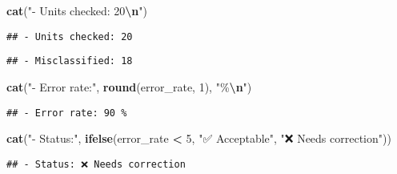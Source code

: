 \documentclass[
]{article}
\newenvironment{Shaded}{\begin{snugshade}}{\end{snugshade}}
\newcommand{\DecValTok}[1]{\textcolor[rgb]{0.00,0.00,0.81}{#1}}
\newcommand{\FunctionTok}[1]{\textcolor[rgb]{0.13,0.29,0.53}{\textbf{#1}}}
\newcommand{\NormalTok}[1]{#1}
\newcommand{\SpecialCharTok}[1]{\textcolor[rgb]{0.81,0.36,0.00}{\textbf{#1}}}
\newcommand{\StringTok}[1]{\textcolor[rgb]{0.31,0.60,0.02}{#1}}
\begin{document}
\begin{Shaded}
\begin{Highlighting}[]
\FunctionTok{cat}\NormalTok{(}\StringTok{"{-} Units checked: 20}\SpecialCharTok{\textbackslash{}n}\StringTok{"}\NormalTok{)}
\end{Highlighting}
\end{Shaded}

\begin{verbatim}
## - Units checked: 20
\end{verbatim}

\begin{Shaded}
\end{Shaded}

\begin{verbatim}
## - Misclassified: 18
\end{verbatim}

\begin{Shaded}
\begin{Highlighting}[]
\FunctionTok{cat}\NormalTok{(}\StringTok{"{-} Error rate:"}\NormalTok{, }\FunctionTok{round}\NormalTok{(error\_rate, }\DecValTok{1}\NormalTok{), }\StringTok{"\%}\SpecialCharTok{\textbackslash{}n}\StringTok{"}\NormalTok{)}
\end{Highlighting}
\end{Shaded}

\begin{verbatim}
## - Error rate: 90 %
\end{verbatim}

\begin{Shaded}
\begin{Highlighting}[]
\FunctionTok{cat}\NormalTok{(}\StringTok{"{-} Status:"}\NormalTok{, }\FunctionTok{ifelse}\NormalTok{(error\_rate }\SpecialCharTok{\textless{}} \DecValTok{5}\NormalTok{, }\StringTok{"✅ Acceptable"}\NormalTok{, }
                       \StringTok{"❌ Needs correction"}\NormalTok{))}
\end{Highlighting}
\end{Shaded}

\begin{verbatim}
## - Status: ❌ Needs correction
\end{verbatim}
\end{document}

